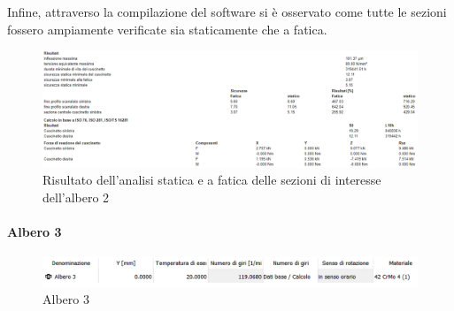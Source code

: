 Infine, attraverso la compilazione del software si è osservato come tutte le sezioni fossero ampiamente verificate sia staticamente che a fatica.
\begin{figure}[h]
    \centering
    \includegraphics[scale=0.4]{Immagini/RisultatiAlbero2.png}
    \caption{Risultato dell'analisi statica e a fatica delle sezioni di interesse dell'albero 2}
    \label{fig:RisultatiALbero2}
\end{figure}

\paragraph{Albero 3}
\begin{figure}[h]
    \centering
    \includegraphics[scale=0.4]{Immagini/DatiAlbero3.png}
    \caption{Albero  3}
    \label{fig:DatiAlbero3}
\end{figure}

